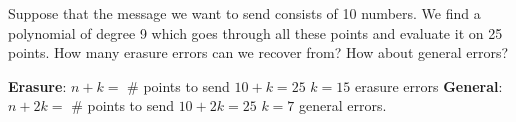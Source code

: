 \question Suppose that the message we want to send consists of 10 
numbers. We find a polynomial of degree 9 which goes through all these 
points and evaluate it on 25 points. How many erasure errors can we 
recover from? How about general errors?
\begin{solution}[1 in]
\textbf{Erasure}: $n + k =$ \# points to send\newline
	$10 + k = 25$ \newline
	$k = 15$ erasure errors\newline
\textbf{General}: $n + 2k =$ \# points to send\newline
	$10 + 2k = 25$\newline
	$k = 7$ general errors.
\end{solution}